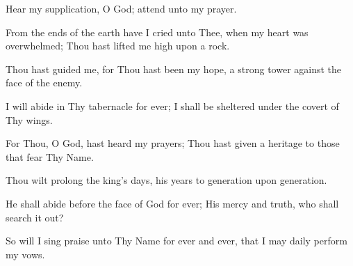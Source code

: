Hear my supplication, O God; attend unto my prayer.

From the ends of the earth have I cried unto Thee, when my heart was overwhelmed; Thou hast lifted me high upon a rock.

Thou hast guided me, for Thou hast been my hope, a strong tower against the face of the enemy.

I will abide in Thy tabernacle for ever; I shall be sheltered under the covert of Thy wings.

For Thou, O God, hast heard my prayers; Thou hast given a heritage to those that fear Thy Name.

Thou wilt prolong the king’s days, his years to generation upon generation.

He shall abide before the face of God for ever; His mercy and truth, who shall search it out?

So will I sing praise unto Thy Name for ever and ever, that I may daily perform my vows.
